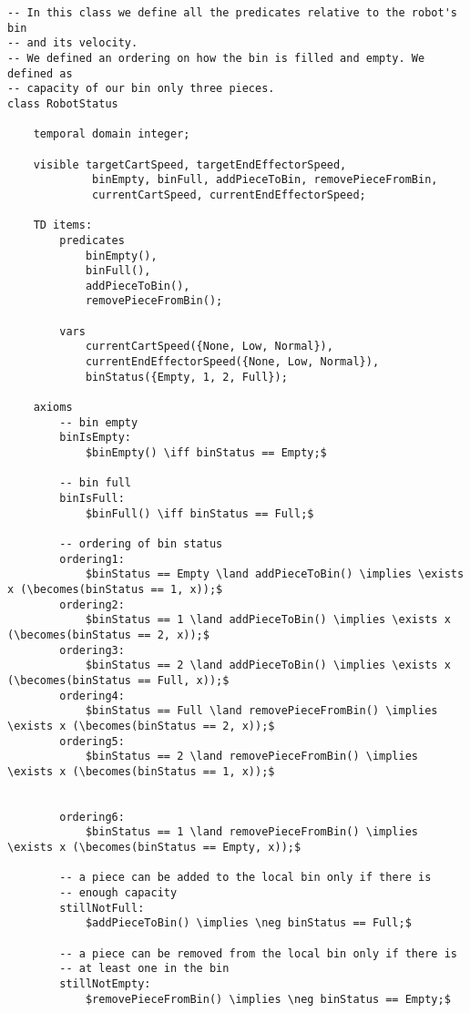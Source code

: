\begin{lstlisting}[fontadjust, mathescape, frame=single] 
-- In this class we define all the predicates relative to the robot's bin 
-- and its velocity.
-- We defined an ordering on how the bin is filled and empty. We defined as 
-- capacity of our bin only three pieces.
class RobotStatus

    temporal domain integer;

    visible targetCartSpeed, targetEndEffectorSpeed, 
             binEmpty, binFull, addPieceToBin, removePieceFromBin,
             currentCartSpeed, currentEndEffectorSpeed;

    TD items:
        predicates
            binEmpty(),
            binFull(),
            addPieceToBin(),
            removePieceFromBin();

        vars
            currentCartSpeed({None, Low, Normal}),
            currentEndEffectorSpeed({None, Low, Normal}),
            binStatus({Empty, 1, 2, Full});

    axioms
        -- bin empty
        binIsEmpty:
            $binEmpty() \iff binStatus == Empty;$

        -- bin full
        binIsFull:
            $binFull() \iff binStatus == Full;$

        -- ordering of bin status
        ordering1:
            $binStatus == Empty \land addPieceToBin() \implies \exists x (\becomes(binStatus == 1, x));$
        ordering2:
            $binStatus == 1 \land addPieceToBin() \implies \exists x (\becomes(binStatus == 2, x));$
        ordering3:
            $binStatus == 2 \land addPieceToBin() \implies \exists x (\becomes(binStatus == Full, x));$
        ordering4:
            $binStatus == Full \land removePieceFromBin() \implies \exists x (\becomes(binStatus == 2, x));$
        ordering5:
            $binStatus == 2 \land removePieceFromBin() \implies \exists x (\becomes(binStatus == 1, x));$

            
        ordering6:
            $binStatus == 1 \land removePieceFromBin() \implies \exists x (\becomes(binStatus == Empty, x));$

        -- a piece can be added to the local bin only if there is 
        -- enough capacity
        stillNotFull:
            $addPieceToBin() \implies \neg binStatus == Full;$

        -- a piece can be removed from the local bin only if there is
        -- at least one in the bin
        stillNotEmpty:
            $removePieceFromBin() \implies \neg binStatus == Empty;$


\end{lstlisting}
